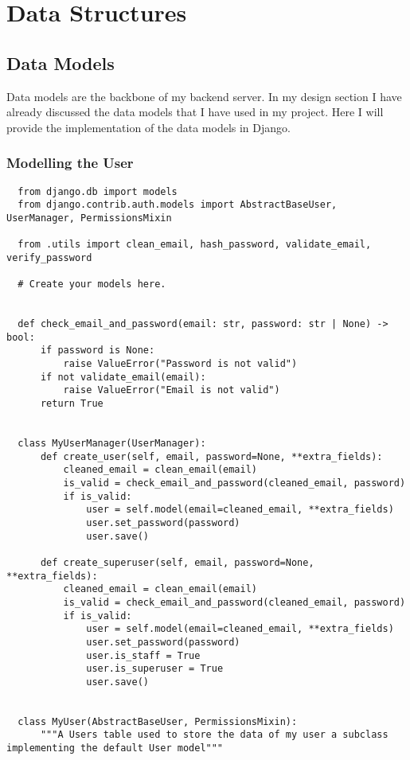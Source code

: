 \section{Data Structures}

\subsection{Data Models}
Data models are the backbone of my backend server. In my design section I have already discussed the data models that I have used in my project. Here I will provide the implementation of the data models in Django.

\subsubsection{Modelling the User}
\begin{verbatim}
  from django.db import models
  from django.contrib.auth.models import AbstractBaseUser, UserManager, PermissionsMixin
  
  from .utils import clean_email, hash_password, validate_email, verify_password
  
  # Create your models here.
  
  
  def check_email_and_password(email: str, password: str | None) -> bool:
      if password is None:
          raise ValueError("Password is not valid")
      if not validate_email(email):
          raise ValueError("Email is not valid")
      return True
  
  
  class MyUserManager(UserManager):
      def create_user(self, email, password=None, **extra_fields):
          cleaned_email = clean_email(email)
          is_valid = check_email_and_password(cleaned_email, password)
          if is_valid:
              user = self.model(email=cleaned_email, **extra_fields)
              user.set_password(password)
              user.save()
  
      def create_superuser(self, email, password=None, **extra_fields):
          cleaned_email = clean_email(email)
          is_valid = check_email_and_password(cleaned_email, password)
          if is_valid:
              user = self.model(email=cleaned_email, **extra_fields)
              user.set_password(password)
              user.is_staff = True
              user.is_superuser = True
              user.save()
  
  
  class MyUser(AbstractBaseUser, PermissionsMixin):
      """A Users table used to store the data of my user a subclass implementing the default User model"""
  

\end{verbatim}
